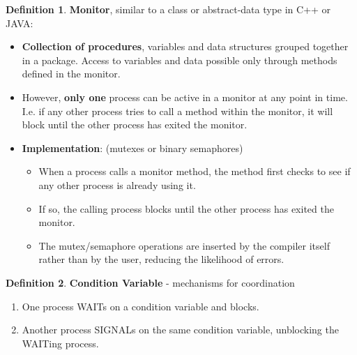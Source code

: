 \documentclass[12pt,a4paper]{article}
\theoremstyle{definition}
\newtheorem{definition}{Definition}[section]
\newenvironment{myitemize}
{ \begin{itemize}
    \setlength{\itemsep}{5pt}
    \setlength{\parskip}{0pt}
    \setlength{\parsep}{0pt}     }
{ \end{itemize}                  }
\newenvironment{myenumerate}
{ \begin{enumerate}
    \setlength{\itemsep}{5pt}
    \setlength{\parskip}{0pt}
    \setlength{\parsep}{0pt}     }
{ \end{enumerate}                }
\begin{document}
\begin{definition}{\textbf{Monitor}}, similar to a class or abstract-data type in C++ or JAVA:
	\begin{myitemize}
		\item \textbf{Collection of procedures}, variables and data structures grouped together in a package. Access to variables and data possible only through methods defined in the monitor.
		\item However, \textbf{only one} process can be active in a monitor at any point in time. I.e. if any other process tries to call a method within the monitor, it will block until the other process has exited the monitor.
		\item \textbf{Implementation}: (mutexes or binary semaphores)
		\begin{myitemize}
			\item When a process calls a monitor method, the method first checks to see if any other process is already using it. 
			\item If so, the calling process blocks until the other process has exited the monitor.
			\item The mutex/semaphore operations are inserted by the compiler itself rather than by the user, reducing the likelihood of errors.
		\end{myitemize}
	\end{myitemize}
\end{definition}

\begin{definition}{\textbf{Condition Variable} - mechanisms for coordination}
	\begin{myenumerate}
		\item One process WAITs on a condition variable and blocks.
		\item Another process SIGNALs on the same condition variable, unblocking the WAITing process.
	\end{myenumerate}
\end{definition}
\end{document}
